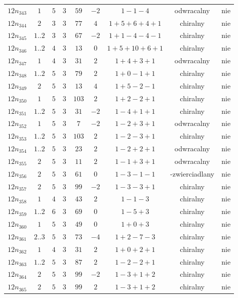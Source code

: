 \begin{longtable}{ccccccccc}
$12n_{343}$ & $1$ & $5$ & $3$ & $59$ & $-2$ & $1-1-4$ & odwracalny & nie \\
$12n_{344}$ & $2$ & $3$ & $3$ & $77$ & $4$ & $1+5+6+4+1$ & chiralny & nie \\
$12n_{345}$ & $1..2$ & $3$ & $3$ & $67$ & $-2$ & $1+1-4-4-1$ & chiralny & nie \\
$12n_{346}$ & $1..2$ & $4$ & $3$ & $13$ & $0$ & $1+5+10+6+1$ & chiralny & nie \\
$12n_{347}$ & $1$ & $4$ & $3$ & $31$ & $2$ & $1+4+3+1$ & odwracalny & nie \\
$12n_{348}$ & $1..2$ & $5$ & $3$ & $79$ & $2$ & $1+0-1+1$ & chiralny & nie \\
$12n_{349}$ & $2$ & $5$ & $3$ & $13$ & $4$ & $1+5-2-1$ & chiralny & nie \\
$12n_{350}$ & $1$ & $5$ & $3$ & $103$ & $2$ & $1+2-2+1$ & chiralny & nie \\
$12n_{351}$ & $1..2$ & $5$ & $3$ & $31$ & $-2$ & $1-4+1+1$ & chiralny & nie \\
$12n_{352}$ & $1$ & $5$ & $3$ & $7$ & $-2$ & $1-2+3+1$ & odwracalny & nie \\
$12n_{353}$ & $1..2$ & $5$ & $3$ & $103$ & $2$ & $1-2-3+1$ & chiralny & nie \\
$12n_{354}$ & $1..2$ & $5$ & $3$ & $23$ & $2$ & $1-2+2+1$ & odwracalny & nie \\
$12n_{355}$ & $2$ & $5$ & $3$ & $11$ & $2$ & $1-1+3+1$ & odwracalny & nie \\
$12n_{356}$ & $2$ & $5$ & $3$ & $61$ & $0$ & $1-3-1-1$ & -zwierciadlany & nie \\
$12n_{357}$ & $2$ & $5$ & $3$ & $99$ & $-2$ & $1-3-3+1$ & chiralny & nie \\
$12n_{358}$ & $1$ & $4$ & $3$ & $43$ & $2$ & $1-1-3$ & chiralny & nie \\
$12n_{359}$ & $1..2$ & $6$ & $3$ & $69$ & $0$ & $1-5+3$ & chiralny & nie \\
$12n_{360}$ & $1$ & $5$ & $3$ & $49$ & $0$ & $1+0+3$ & chiralny & nie \\
$12n_{361}$ & $2..3$ & $5$ & $3$ & $73$ & $-4$ & $1+2-7-3$ & chiralny & nie \\
$12n_{362}$ & $1$ & $4$ & $3$ & $31$ & $2$ & $1+0+2+1$ & chiralny & nie \\
$12n_{363}$ & $1..2$ & $5$ & $3$ & $87$ & $2$ & $1-2-2+1$ & chiralny & nie \\
$12n_{364}$ & $2$ & $5$ & $3$ & $99$ & $-2$ & $1-3+1+2$ & chiralny & nie \\
$12n_{365}$ & $2$ & $5$ & $3$ & $99$ & $2$ & $1-3+1+2$ & chiralny & nie \\

\end{longtable}
